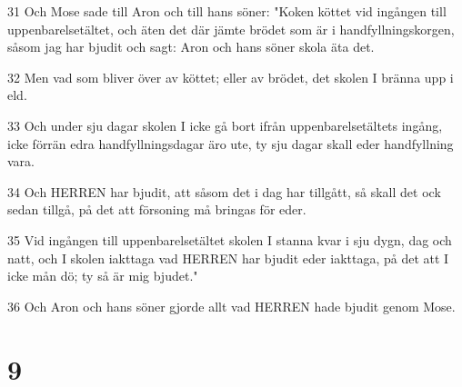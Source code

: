 \par 31 Och Mose sade till Aron och till hans söner: "Koken köttet vid ingången till uppenbarelsetältet, och äten det där jämte brödet som är i handfyllningskorgen, såsom jag har bjudit och sagt: Aron och hans söner skola äta det.
\par 32 Men vad som bliver över av köttet; eller av brödet, det skolen I bränna upp i eld.
\par 33 Och under sju dagar skolen I icke gå bort ifrån uppenbarelsetältets ingång, icke förrän edra handfyllningsdagar äro ute, ty sju dagar skall eder handfyllning vara.
\par 34 Och HERREN har bjudit, att såsom det i dag har tillgått, så skall det ock sedan tillgå, på det att försoning må bringas för eder.
\par 35 Vid ingången till uppenbarelsetältet skolen I stanna kvar i sju dygn, dag och natt, och I skolen iakttaga vad HERREN har bjudit eder iakttaga, på det att I icke mån dö; ty så är mig bjudet."
\par 36 Och Aron och hans söner gjorde allt vad HERREN hade bjudit genom Mose.

\chapter{9}

